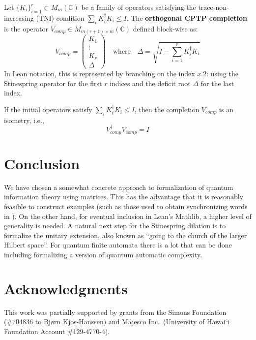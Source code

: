 \begin{definition}
Let $\{K_i\}_{i=1}^r \subset M_m(\mathbb{C})$ be a family of operators satisfying the trace-non-increasing (TNI) condition $\sum_i K_i^\dagger K_i \le I$. The \textbf{orthogonal CPTP completion} is the operator $V_{comp} \in M_{m(r+1) \times m}(\mathbb{C})$ defined block-wise as:
\begin{equation}
    V_{comp} = \begin{pmatrix} 
    K_1 \\ \vdots \\ K_r \\ \Delta
    \end{pmatrix} 
    \quad \text{where} \quad 
    \Delta = \sqrt{I - \sum_{i=1}^r K_i^\dagger K_i}
\end{equation}
In Lean notation, this is represented by branching on the index $x.2$: using the Stinespring operator for the first $r$ indices and the deficit root $\Delta$ for the last index.
\end{definition}

\begin{theorem}
If the initial operators satisfy $\sum_i K_i^\dagger K_i \le I$, then the completion $V_{comp}$ is an isometry, i.e.,
\begin{equation}
    V_{comp}^\dagger V_{comp} = I
\end{equation}
\end{theorem}

%
\section{Conclusion}
	We have chosen a somewhat concrete approach to formalization of quantum information theory using matrices.
	This has the advantage that it is reasonably feasible to construct examples (such as those used to obtain synchronizing words
	in \cite{kjoshanssen2026unboundedlengthminimalsynchronizing}).
	On the other hand, for eventual inclusion in Lean's Mathlib, a higher level of generality is needed.
	A natural next step for the Stinespring dilation is to formalize the unitary extension, also known as ``going to the church of the larger Hilbert space''.
	For quantum finite automata there is a lot that can be done including formalizing a version of quantum automatic complexity.

\section*{Acknowledgments}
This work was partially supported by grants from the Simons Foundation (\#704836
to Bj{\o}rn Kjos-Hanssen) and Majesco Inc.~(University of Hawai\textquoteleft i Foundation
Account \#129-4770-4).
\newpage



